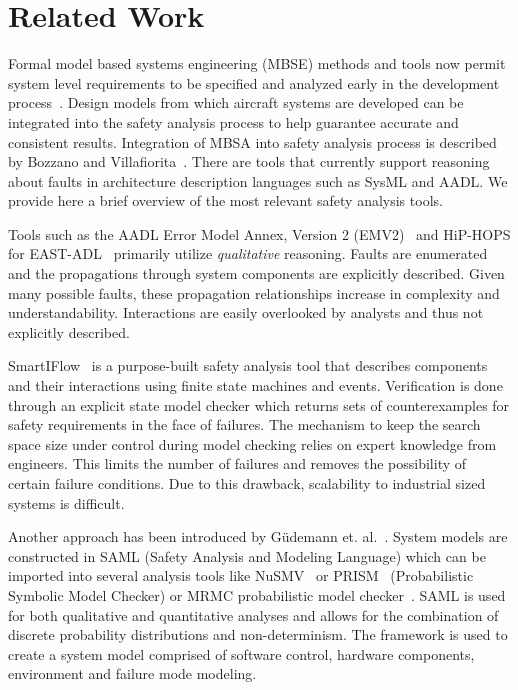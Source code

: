 \section{Related Work}
\label{sec:related_work}

Formal model based systems engineering (MBSE) methods and tools now permit system level requirements to be specified and analyzed early in the development process~\cite{QFCS15:backes,CIMATTI2015333, NFM2012:CoGaMiWhLaLu, hilt2013:MuWhRaHe}. Design models from which aircraft systems are developed can be integrated into the safety analysis process to help guarantee accurate and consistent results. Integration of MBSA into safety analysis process is described by Bozzano and Villafiorita~\cite{Bozzano:2010:DSA:1951720}. There are tools that currently support reasoning about faults in architecture description languages such as SysML and AADL. We provide here a brief overview of the most relevant safety analysis tools. 

Tools such as the AADL Error Model Annex, Version 2 (EMV2)~\cite{EMV2} and HiP-HOPS for EAST-ADL~\cite{CHEN201391} primarily utilize \textit{qualitative} reasoning. Faults are enumerated and the propagations through system components are explicitly described. Given many possible faults, these propagation relationships increase in complexity and understandability. Interactions are easily overlooked by analysts and thus not explicitly described.


SmartIFlow~\cite{info8010007} is a purpose-built safety analysis tool that describes components and their interactions using finite state machines and events. Verification is done through an explicit state model checker which returns sets of counterexamples for safety requirements in the face of failures. The mechanism to keep the search space size under control during model checking relies on expert knowledge from engineers. This limits the number of failures and removes the possibility of certain failure conditions. Due to this drawback, scalability to industrial sized systems is difficult. 

Another approach has been introduced by Güdemann et. al.~\cite{Gudemann:2010:FQQ:1909626.1909813}. System models are constructed in SAML (Safety Analysis and Modeling Language) which can be imported into several analysis tools like NuSMV~\cite{Cimatti2000} or PRISM~\cite{CAV2011:KwNoPa} (Probabilistic Symbolic Model Checker) or MRMC probabilistic model checker~\cite{Katoen:2005:MRM:1114692.1115230}. SAML is used for both qualitative and quantitative analyses and allows for the combination of discrete probability distributions and non-determinism. The framework is used to create a system model comprised of software control, hardware components, environment and failure mode modeling. 

